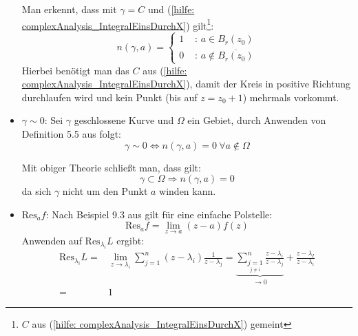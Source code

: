 \documentclass[a4paper,12pt]{report}
\newcommand{\1}{\mathds{1}}
\newcommand{\Res}{\text{Res}}
\theoremstyle{plain} %
\theoremstyle{definition} %
\theoremstyle{remark}
\begin{document}
\begin{itemize}
                        Man erkennt, dass mit $\gamma = C$  und (\ref{hilfe: complexAnalysis_IntegralEinsDurchX}) gilt\footnote{$C$ aus (\ref{hilfe: complexAnalysis_IntegralEinsDurchX}) gemeint}:
                        \begin{equation}
                              \label{hilfe: complexAnalysis_WindungNullEins}
                              n(\gamma,a) = \begin{cases}
                                    1& \text{ : }a\in B_r(z_0)\\
                                    0& \text{ : }a\notin\overline {B_r(z_0)}
                              \end{cases}
                        \end{equation}
                        Hierbei benötigt man das $C$ aus (\ref{hilfe: complexAnalysis_IntegralEinsDurchX}), damit der Kreis in positive Richtung durchlaufen wird und kein Punkt (bis auf $z=z_0+1$) mehrmals vorkommt.
                  \item $\gamma \sim 0$:
                        Sei $\gamma$ geschlossene Kurve und $\Omega$ ein Gebiet, durch Anwenden von Definition 5.5 aus \cite[S. 67]{complexAnalysis} folgt:
                        $$\gamma \sim 0 \Leftrightarrow n(\gamma, a)=0\ \forall a\notin \Omega$$

                        Mit obiger Theorie schließt man, dass gilt:
                        $$\gamma\subset \Omega \Rightarrow n(\gamma, a)=0$$
                        da sich $\gamma$ nicht um den Punkt $a$ winden kann.

                  \item $\Res_af$:
                        Nach Beispiel 9.3 aus \cite[S. 142]{complexAnalysis} gilt für eine einfache Polstelle:
                        \begin{equation}
                              \label{hilfe: complexAnalysis_Residuum}
                              \Res_af = \lim_{z\to a} (z-a)f(z)
                        \end{equation}
                        Anwenden auf $\Res_{\lambda_i}L$ ergibt:
                        \begin{align*}
                              \Res_{\lambda_i}L =& \lim_{z\to \lambda_i} \sum_{j=1}^{n} (z-\lambda_i)\frac{1}{z-\lambda_j} = \underbrace{\sum_{\underset{j\ne i}{j=1}}^{n} \frac{z-\lambda_i}{z-\lambda_j}}_{\to 0} + \frac{z-\lambda_I}{z-\lambda_i} \\
                              =& 1
                        \end{align*}


\end{itemize}
\end{document}
